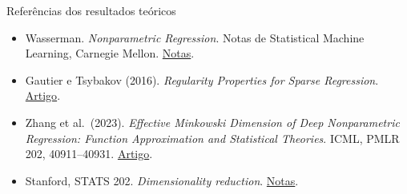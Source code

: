 \documentclass[
  10pt,
  ignorenonframetext,
  aspectratio=169,
  brazilian,
]{beamer}
\providecommand{\tightlist}{%
  \setlength{\itemsep}{0pt}\setlength{\parskip}{0pt}}
\begin{document}
\begin{frame}{Referências dos resultados teóricos}
\protect{}\label{referuxeancias-dos-resultados-teuxf3ricos}
\begin{itemize}
\tightlist
\item
  Wasserman. \emph{Nonparametric Regression}. Notas de Statistical
  Machine Learning, Carnegie Mellon.
  \href{https://stat.cmu.edu/~larry/=sml/nonpar.pdf}{Notas}.
\item
  Gautier e Tsybakov (2016). \emph{Regularity Properties for Sparse
  Regression}.
  \href{https://pmc.ncbi.nlm.nih.gov/articles/mid/NIHMS750383/}{Artigo}.
\item
  Zhang et al.~(2023). \emph{Effective Minkowski Dimension of Deep
  Nonparametric Regression: Function Approximation and Statistical
  Theories}. ICML, PMLR 202, 40911--40931.
  \href{https://proceedings.mlr.press/v202/zhang23f.html}{Artigo}.
\item
  Stanford, STATS 202. \emph{Dimensionality reduction}.
  \href{https://web.stanford.edu/class/stats202/notes/Model-selection/Dimensionality-reduction.html}{Notas}.
\end{itemize}
\end{frame}
\end{document}
